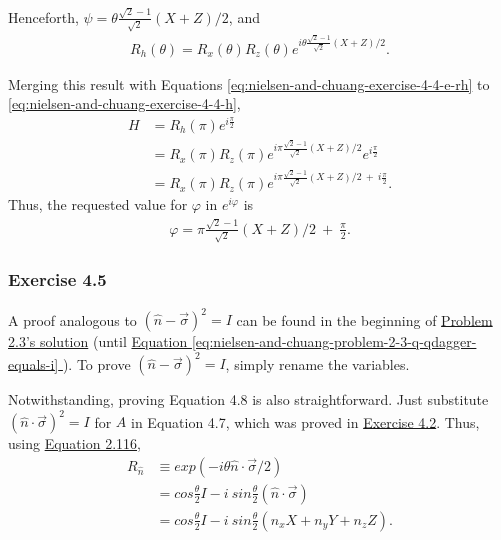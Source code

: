 Henceforth, $\psi = \theta \frac{\sqrt2 - 1}{\sqrt 2} (X + Z) / 2$, and
\begin{align}
    R_h(\theta) = R_x(\theta) R_z(\theta) e^{i \theta \frac{\sqrt2 - 1}{\sqrt 2} (X + Z) / 2}.
\end{align}

Merging this result with Equations
\ref{eq:nielsen-and-chuang-exercise-4-4-e-rh} to \ref{eq:nielsen-and-chuang-exercise-4-4-h},
\begin{align}
    H &= R_h(\pi) e^{i \frac \pi 2} \\
    &= R_x(\pi) R_z(\pi) e^{i \pi \frac{\sqrt2 - 1}{\sqrt 2} (X + Z) / 2} e^{i \frac \pi 2} \\
    &= R_x(\pi) R_z(\pi) e^{i \pi \frac{\sqrt2 - 1}{\sqrt 2} (X + Z) / 2\ +\ i \frac \pi 2}.
\end{align}
Thus, the requested value for $\varphi$ in $e^{i \varphi}$ is
\begin{align}
    \varphi = \pi \frac{\sqrt2 - 1}{\sqrt 2} (X + Z) / 2\ +\ \frac \pi 2.
\end{align}

\subsubsection{Exercise 4.5}
A proof analogous to $(\hat{n} - \vec{\sigma})^2 = I$ can be found in the beginning of
\hyperref[sec:nielsen-and-chuang-problem-2-3]{Problem 2.3's solution}
(until
\hyperref[eq:nielsen-and-chuang-problem-2-3-q-qdagger-equals-i]{
    Equation \ref{eq:nielsen-and-chuang-problem-2-3-q-qdagger-equals-i}
}).
To prove $(\hat{n} - \vec{\sigma})^2 = I$, simply rename the variables.

Notwithstanding, proving Equation 4.8 is also straightforward.
Just substitute $(\hat{n} \cdot \vec{\sigma})^2 = I$ for $A$ in Equation 4.7,
which was proved in \hyperref[sec:nielsen-and-chuang-exercise-4-2]{Exercise 4.2}.
Thus, using \hyperref[sec:nielsen-and-chuang-equation-2-116]{Equation 2.116},
\begin{align}
    R_{\hat{n}} &\equiv exp(-i \theta \hat{n} \cdot \vec{\sigma}/2) \\
    &= cos \frac \theta 2 I - i\ sin \frac \theta 2 (\hat{n} \cdot \vec{\sigma}) \\
    &= cos \frac \theta 2 I - i\ sin \frac \theta 2 (n_x X + n_y Y + n_z Z).
\end{align}
